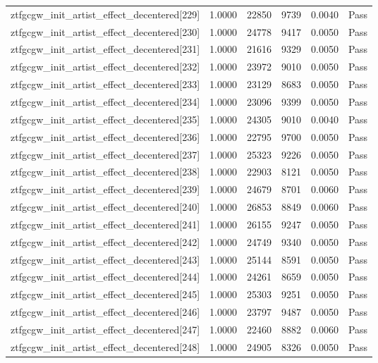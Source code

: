 \begin{table}[htbp]
\begin{tabular}{llrrll}
ztfgcgw\_init\_artist\_effect\_decentered[229] & 1.0000 & 22850 & 9739 & 0.0040 & Pass \\
ztfgcgw\_init\_artist\_effect\_decentered[230] & 1.0000 & 24778 & 9417 & 0.0050 & Pass \\
ztfgcgw\_init\_artist\_effect\_decentered[231] & 1.0000 & 21616 & 9329 & 0.0050 & Pass \\
ztfgcgw\_init\_artist\_effect\_decentered[232] & 1.0000 & 23972 & 9010 & 0.0050 & Pass \\
ztfgcgw\_init\_artist\_effect\_decentered[233] & 1.0000 & 23129 & 8683 & 0.0050 & Pass \\
ztfgcgw\_init\_artist\_effect\_decentered[234] & 1.0000 & 23096 & 9399 & 0.0050 & Pass \\
ztfgcgw\_init\_artist\_effect\_decentered[235] & 1.0000 & 24305 & 9010 & 0.0040 & Pass \\
ztfgcgw\_init\_artist\_effect\_decentered[236] & 1.0000 & 22795 & 9700 & 0.0050 & Pass \\
ztfgcgw\_init\_artist\_effect\_decentered[237] & 1.0000 & 25323 & 9226 & 0.0050 & Pass \\
ztfgcgw\_init\_artist\_effect\_decentered[238] & 1.0000 & 22903 & 8121 & 0.0050 & Pass \\
ztfgcgw\_init\_artist\_effect\_decentered[239] & 1.0000 & 24679 & 8701 & 0.0060 & Pass \\
ztfgcgw\_init\_artist\_effect\_decentered[240] & 1.0000 & 26853 & 8849 & 0.0060 & Pass \\
ztfgcgw\_init\_artist\_effect\_decentered[241] & 1.0000 & 26155 & 9247 & 0.0050 & Pass \\
ztfgcgw\_init\_artist\_effect\_decentered[242] & 1.0000 & 24749 & 9340 & 0.0050 & Pass \\
ztfgcgw\_init\_artist\_effect\_decentered[243] & 1.0000 & 25144 & 8591 & 0.0050 & Pass \\
ztfgcgw\_init\_artist\_effect\_decentered[244] & 1.0000 & 24261 & 8659 & 0.0050 & Pass \\
ztfgcgw\_init\_artist\_effect\_decentered[245] & 1.0000 & 25303 & 9251 & 0.0050 & Pass \\
ztfgcgw\_init\_artist\_effect\_decentered[246] & 1.0000 & 23797 & 9487 & 0.0050 & Pass \\
ztfgcgw\_init\_artist\_effect\_decentered[247] & 1.0000 & 22460 & 8882 & 0.0060 & Pass \\
ztfgcgw\_init\_artist\_effect\_decentered[248] & 1.0000 & 24905 & 8326 & 0.0050 & Pass \\

\end{tabular}
\end{table}
